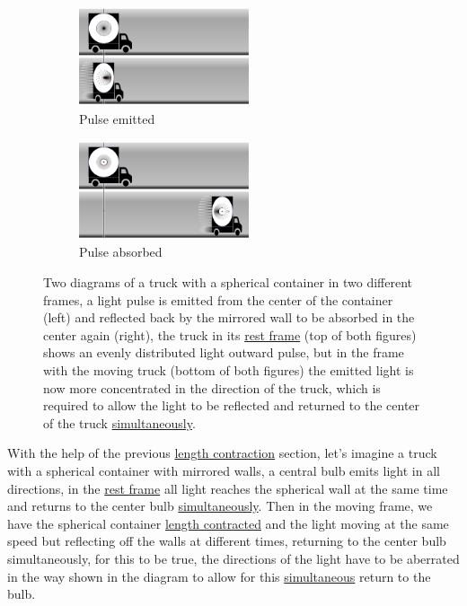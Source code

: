 \begin{figure}[htbp]
	\begin{subfigure}{.49\textwidth}
		\centering
		\includegraphics[width=5cm]{images/pdf/Aberrated_lorrys_1.pdf}
		\caption{Pulse emitted}
		\label{fig: truck aberrated 1}
	\end{subfigure}
	\begin{subfigure}{.49\textwidth}
		\centering
		\includegraphics[width=5cm]{images/pdf/Aberrated_lorrys_2.pdf}
		\caption{Pulse absorbed}
		\label{fig: truck aberrated 2}
	\end{subfigure}
	\caption{Two diagrams of a truck with a spherical container in two different frames, a light pulse is emitted from the center of the container (left) and reflected back by the mirrored wall to be absorbed in the center again (right), the truck in its \protect\hyperlink{def-proper-frame}{rest frame} (top of both figures) shows an evenly distributed light outward pulse, but in the frame with the moving truck (bottom of both figures) the emitted light is now more concentrated in the direction of the truck, which is required to allow the light to be reflected and returned to the center of the truck \protect\hyperlink{def-simultaneity}{simultaneously}.}
	\label{fig: truck aberrated}
\end{figure}

With the help of the previous \hyperlink{def-length-contraction}{length contraction} section, let's imagine a truck with a spherical container with mirrored walls, a central bulb emits light in all directions, in the \hyperlink{def-proper-frame}{rest frame} all light reaches the spherical wall at the same time and returns to the center bulb \hyperlink{def-simultaneity}{simultaneously}.
Then in the moving frame, we have the spherical container \hyperlink{def-length-contraction}{length contracted} and the light moving at the same speed but reflecting off the walls at different times, returning to the center bulb simultaneously, for this to be true, the directions of the light have to be aberrated in the way shown in the diagram to allow for this \hyperlink{def-simultaneity}{simultaneous} return to the bulb.

